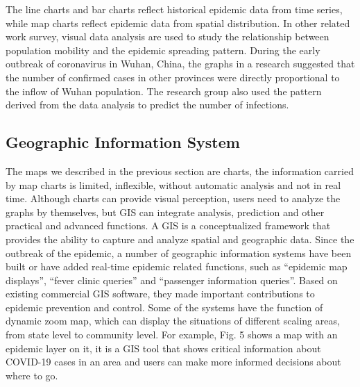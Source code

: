 \documentclass[conference]{IEEEtran}
\begin{document}
The line charts and bar charts reflect historical epidemic data from time series, while map charts reflect epidemic data from spatial distribution.
In other related work survey, visual data analysis are used to study the relationship between population mobility and the epidemic spreading pattern.
During the early outbreak of coronavirus in Wuhan, China, the graphs in a research suggested that the number of confirmed cases in other provinces were directly proportional to the inflow of Wuhan population.
The research group also used the pattern derived from the data analysis to predict the number of infections\cite{chen2020data}.

\subsection{Geographic Information System}
The maps we described in the previous section are charts, the information carried by map charts is limited, inflexible, without automatic analysis and not in real time.
Although charts can provide visual perception, users need to analyze the graphs by themselves, but GIS can integrate analysis, prediction and other practical and advanced functions.
A GIS is a conceptualized framework that provides the ability to capture and analyze spatial and geographic data\cite{clarke1986advances}.
Since the outbreak of the epidemic, a number of geographic information systems have been built or have added real-time epidemic related functions, such as ``epidemic map displays'', ``fever clinic queries'' and ``passenger information queries''.
Based on existing commercial GIS software, they made important contributions to epidemic prevention and control\cite{zhou2020covid}.
Some of the systems have the function of dynamic zoom map, which can display the situations of different scaling areas, from state level to community level.
For example, Fig. 5 shows a map with an epidemic layer on it, it is a GIS tool that shows critical information about COVID-19 cases in an area and users can make more informed decisions about where to go.
\end{document}
